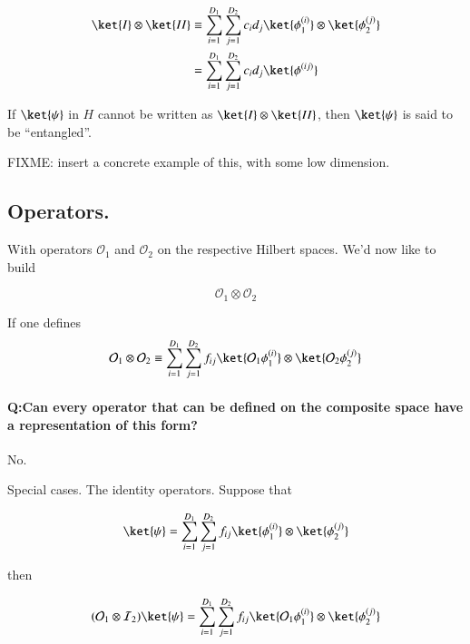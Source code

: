 \begin{align*}
\ket{I} \otimes \ket{II} 
&\equiv
\sum_{i = 1}^{D_1}
\sum_{j = 1}^{D_2}
c_i d_j
\ket{ \phi_1^{(i)}} \otimes \ket{ \phi_2^{(j)}} \\
&=
\sum_{i = 1}^{D_1}
\sum_{j = 1}^{D_2}
c_i d_j
\ket{ \phi^{(ij)}} 
\end{align*}

If $\ket{\psi}$ in $H$ cannot be written as $\ket{I} \otimes \ket{II}$, then $\ket{\psi}$ is said to be ``entangled''.

FIXME: insert a concrete example of this, with some low dimension.

\subsection{Operators.}

With operators $\mathcal{O}_1$ and $\mathcal{O}_2$ on the respective Hilbert spaces.  We'd now like to build 

\begin{equation}\label{eqn:qmTwoL1:230}
\mathcal{O}_1 \otimes \mathcal{O}_2
\end{equation}

If one defines
\begin{equation}\label{eqn:qmTwoL1:250}
\mathcal{O}_1 \otimes \mathcal{O}_2
\equiv
\sum_{i = 1}^{D_1}
\sum_{j = 1}^{D_2}
f_{ij}
\ket{ \mathcal{O}_1 \phi_1^{(i)}} \otimes \ket{ \mathcal{O}_2 \phi_2^{(j)}} 
\end{equation}

\paragraph{Q:Can every operator that can be defined on the composite space have a representation of this form?}

No.

Special cases.  The identity operators.  Suppose that 

\begin{equation}\label{eqn:qmTwoL1:270}
\ket{\psi}
=
\sum_{i = 1}^{D_1}
\sum_{j = 1}^{D_2}
f_{ij}
\ket{ \phi_1^{(i)}} \otimes \ket{ \phi_2^{(j)}} 
\end{equation}

then

\begin{equation}\label{eqn:qmTwoL1:290}
(\mathcal{O}_1 \otimes \mathcal{I}_2) \ket{\psi}
=
\sum_{i = 1}^{D_1}
\sum_{j = 1}^{D_2}
f_{ij}
\ket{ \mathcal{O}_1 \phi_1^{(i)}} \otimes \ket{ \phi_2^{(j)}} 
\end{equation}

